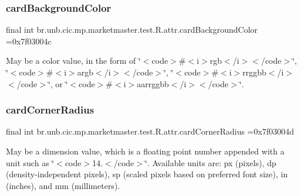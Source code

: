 \subsubsection{\texorpdfstring{card\+Background\+Color}{cardBackgroundColor}}
{\footnotesize\ttfamily final int br.\+unb.\+cic.\+mp.\+marketmaster.\+test.\+R.\+attr.\+card\+Background\+Color =0x7f03004c\hspace{0.3cm}{\ttfamily [static]}}

May be a color value, in the form of \char`\"{}$<$code$>$\#$<$i$>$rgb$<$/i$>$$<$/code$>$\char`\"{}, \char`\"{}$<$code$>$\#$<$i$>$argb$<$/i$>$$<$/code$>$\char`\"{}, \char`\"{}$<$code$>$\#$<$i$>$rrggbb$<$/i$>$$<$/code$>$\char`\"{}, or \char`\"{}$<$code$>$\#$<$i$>$aarrggbb$<$/i$>$$<$/code$>$\char`\"{}. \mbox{\label{classbr_1_1unb_1_1cic_1_1mp_1_1marketmaster_1_1test_1_1R_1_1attr_aad1f54004e9fb734709ca28348126df3}} 
\subsubsection{\texorpdfstring{card\+Corner\+Radius}{cardCornerRadius}}
{\footnotesize\ttfamily final int br.\+unb.\+cic.\+mp.\+marketmaster.\+test.\+R.\+attr.\+card\+Corner\+Radius =0x7f03004d\hspace{0.3cm}{\ttfamily [static]}}

May be a dimension value, which is a floating point number appended with a unit such as \char`\"{}$<$code$>$14.\+5sp$<$/code$>$\char`\"{}. Available units are\+: px (pixels), dp (density-\/independent pixels), sp (scaled pixels based on preferred font size), in (inches), and mm (millimeters). \mbox{\label{classbr_1_1unb_1_1cic_1_1mp_1_1marketmaster_1_1test_1_1R_1_1attr_a93436d5dea67fba1599c96fa8abd9d79}} 
